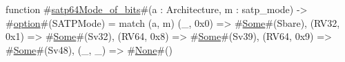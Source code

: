 function #\hyperref[sailRISCVzsatp64Modezyofzybits]{satp64Mode\_of\_bits}#(a : Architecture, m : satp_mode) -> #\hyperref[sailRISCVzoption]{option}#(SATPMode) =
  match (a, m) {
    (_,    0x0) => #\hyperref[sailRISCVzSome]{Some}#(Sbare),
    (RV32, 0x1) => #\hyperref[sailRISCVzSome]{Some}#(Sv32),
    (RV64, 0x8) => #\hyperref[sailRISCVzSome]{Some}#(Sv39),
    (RV64, 0x9) => #\hyperref[sailRISCVzSome]{Some}#(Sv48),
    (_, _)      => #\hyperref[sailRISCVzNone]{None}#()
  }
